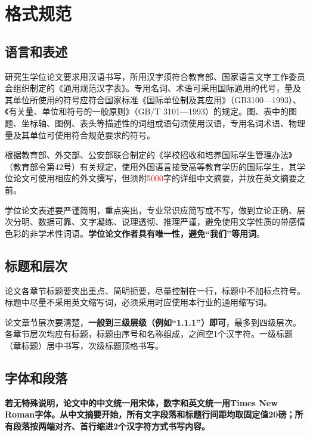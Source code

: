 \chapter{格式规范}\label{第2章}

\section{语言和表述}

研究生学位论文要求用汉语书写，所用汉字须符合教育部、国家语言文字工作委员会组织制定的《通用规范汉字表》。专用名词、术语可采用国际通用的代号，量及其单位所使用的符号应符合国家标准《国际单位制及其应用》（GB3100—1993）、《有关量、单位和符号的一般原则》（GB/T 3101—1993）的规定。图、表中的图题、坐标轴、图例、表头等描述性的词组或语句须使用汉语，专用名词术语、物理量及其单位可使用符合规范要求的符号。

根据教育部、外交部、公安部联合制定的《学校招收和培养国际学生管理办法》（教育部令第42号）有关规定，使用外国语言接受高等教育学历的国际学生，其学位论文可使用相应的外文撰写，但须附\textcolor{red}{5000}字的详细中文摘要，并放在英文摘要之前。

学位论文表述要严谨简明，重点突出，专业常识应简写或不写，做到立论正确、层次分明、数据可靠、文字凝练、说理透彻、推理严谨，避免使用文学性质的带感情色彩的非学术性词语。\textbf{学位论文作者具有唯一性，避免“我们”等用词}。

\section{标题和层次}

论文各章节标题要突出重点、简明扼要，尽量控制在一行，标题中不加标点符号。标题中尽量不采用英文缩写词，必须采用时应使用本行业的通用缩写词。

论文章节层次要清楚，\textbf{一般到三级层级（例如“1.1.1”）即可}，最多到四级层次。各章节层次均应有标题，标题由序号和名称组成，之间空1个汉字符。一级标题（章标题）居中书写，次级标题顶格书写。

\section{字体和段落}

\textbf{若无特殊说明，论文中的中文统一用宋体，数字和英文统一用Times New Roman字体。从中文摘要开始，所有文字段落和标题行间距均取固定值20磅；所有段落按两端对齐、首行缩进2个汉字符方式书写内容。}

